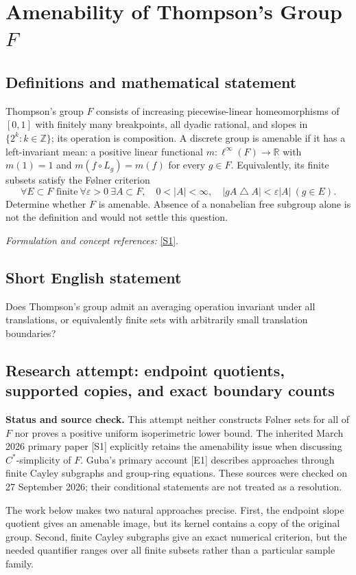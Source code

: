 \documentclass[11pt]{article}
\begin{document}
\section*{\texorpdfstring{Amenability of Thompson's Group $F$}{Amenability of Thompson's Group \$F\$}}\label{statement}
\subsection{Definitions and mathematical statement}
Thompson's group $F$ consists of increasing piecewise-linear homeomorphisms of $[0,1]$ with finitely many breakpoints, all dyadic rational, and slopes in $\{2^k:k\in{\mathbb{Z}}\}$; its operation is composition. A discrete group is amenable if it has a left-invariant mean: a positive linear functional $m:\ell^\infty(F)\to{\mathbb{R}}$ with $m(1)=1$ and $m(f\circ L_g)=m(f)$ for every $g\in F$. Equivalently, its finite subsets satisfy the F\o lner criterion
\[
 \forall E\subset F\text{ finite}\ \forall{\varepsilon}>0\ \exists A\subset F,
 \quad0<|A|<\infty,\quad |gA\mathbin{\triangle} A|<{\varepsilon}|A|\ (g\in E).
\]
Determine whether $F$ is amenable. Absence of a nonabelian free subgroup alone is not the definition and would not settle this question.
\par\smallskip\textit{Formulation and concept references:} \href{https://arxiv.org/abs/2603.28228}{[S1]}.

\subsection{Short English statement}
Does Thompson's group admit an averaging operation invariant under all translations, or equivalently finite sets with arbitrarily small translation boundaries?
\subsection{Research attempt: endpoint quotients, supported copies, and exact boundary counts}
\textbf{Status and source check.} This attempt neither constructs F\o lner sets for all of $F$ nor proves a positive uniform isoperimetric lower bound. The inherited March 2026 primary paper [S1] explicitly retains the amenability issue when discussing $C^*$-simplicity of $F$. Guba's primary account [E1] describes approaches through finite Cayley subgraphs and group-ring equations. These sources were checked on 27 September 2026; their conditional statements are not treated as a resolution.

The work below makes two natural approaches precise. First, the endpoint slope quotient gives an amenable image, but its kernel contains a copy of the original group. Second, finite Cayley subgraphs give an exact numerical criterion, but the needed quantifier ranges over all finite subsets rather than a particular sample family.
\end{document}
